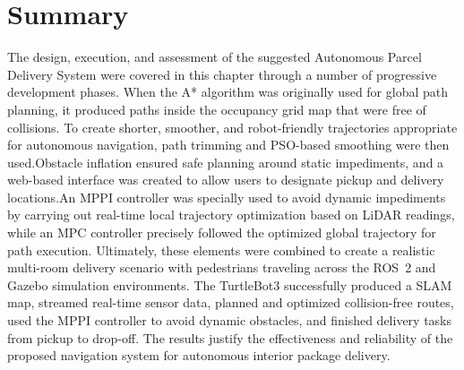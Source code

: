 \section{Summary}
The design, execution, and assessment of the suggested Autonomous Parcel Delivery System were covered in this chapter through a number of progressive development phases. When the A* algorithm was originally used for global path planning, it produced paths inside the occupancy grid map that were free of collisions. To create shorter, smoother, and robot-friendly trajectories appropriate for autonomous navigation, path trimming and PSO-based smoothing were then used.Obstacle inflation ensured safe planning around static impediments, and a web-based interface was created to allow users to designate pickup and delivery locations.An MPPI controller was specially used to avoid dynamic impediments by carrying out real-time local trajectory optimization based on LiDAR readings, while an MPC controller precisely followed the optimized global trajectory for path execution.
Ultimately, these elements were combined to create a realistic multi-room delivery scenario with pedestrians traveling across the ROS~2 and Gazebo simulation environments. The TurtleBot3 successfully produced a SLAM map, streamed real-time sensor data, planned and optimized collision-free routes, used the MPPI controller to avoid dynamic obstacles, and finished delivery tasks from pickup to drop-off. The results justify the effectiveness and reliability of the proposed navigation system for autonomous interior package delivery.

